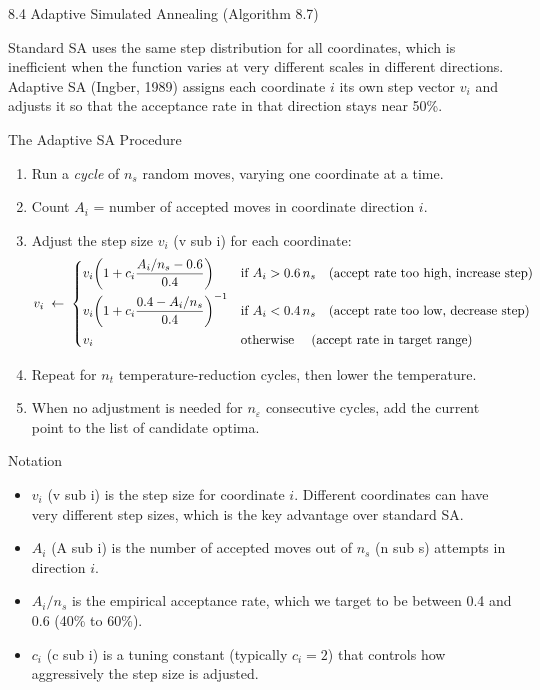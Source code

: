 \documentclass[aspectratio=169,10pt]{beamer}
\begin{document}
\begin{frame}[allowframebreaks]{8.4 Adaptive Simulated Annealing (Algorithm 8.7)}

Standard SA uses the same step distribution for all coordinates, which is inefficient when the function varies at very different scales in different directions.
Adaptive SA (Ingber, 1989) assigns each coordinate $i$ its own step vector $v_i$ and adjusts it so that the acceptance rate in that direction stays near 50\%.

\begin{block}{The Adaptive SA Procedure}
\begin{enumerate}
  \item Run a \emph{cycle} of $n_s$ random moves, varying one coordinate at a time.
  \item Count $A_i$ = number of accepted moves in coordinate direction $i$.
  \item Adjust the step size $v_i$ (v sub i) for each coordinate:
    \[
      v_i \;\leftarrow\;
      \begin{cases}
        v_i\!\left(1 + c_i\dfrac{A_i/n_s - 0.6}{0.4}\right)
          & \text{if } A_i > 0.6\,n_s \quad \text{(accept rate too high, increase step)} \\[8pt]
        v_i\!\left(1 + c_i\dfrac{0.4 - A_i/n_s}{0.4}\right)^{-1}
          & \text{if } A_i < 0.4\,n_s \quad \text{(accept rate too low, decrease step)} \\[8pt]
        v_i & \text{otherwise \quad (accept rate in target range)}
      \end{cases}
    \]
  \item Repeat for $n_t$ temperature-reduction cycles, then lower the temperature.
  \item When no adjustment is needed for $n_\varepsilon$ consecutive cycles, add the current point to the list of candidate optima.
\end{enumerate}
\end{block}

\begin{block}{Notation}
\begin{itemize}
  \item $v_i$ (v sub i) is the step size for coordinate $i$. Different coordinates can have very different step sizes, which is the key advantage over standard SA.
  \item $A_i$ (A sub i) is the number of accepted moves out of $n_s$ (n sub s) attempts in direction $i$.
  \item $A_i / n_s$ is the empirical acceptance rate, which we target to be between 0.4 and 0.6 (40\% to 60\%).
  \item $c_i$ (c sub i) is a tuning constant (typically $c_i = 2$) that controls how aggressively the step size is adjusted.
\end{itemize}
\end{block}


\end{frame}
\end{document}
